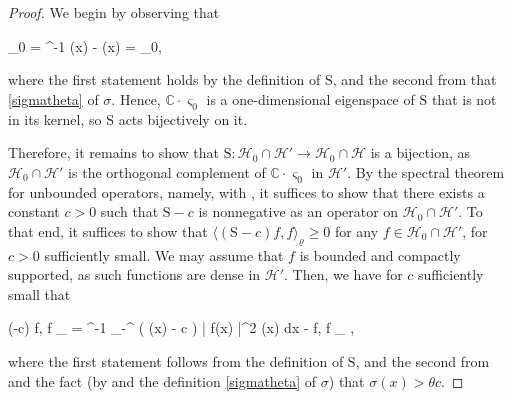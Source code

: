 \documentclass{amsart}
\numberwithin{equation}{section}
\theoremstyle{remark}
\theoremstyle{definition}
\begin{document}
	\begin{proof} 
		
		We begin by observing that
		\begin{flalign} 
			\label{salpha} 
			  \varsigma_0 = \theta^{-1} \cdot \sigma (x) -  \varrho (x)  = \alpha \cdot \varsigma_0,
		\end{flalign}
		
		\noindent where the first statement holds by the definition of $\bm{\mathrm{S}}$, and the second from that \eqref{sigmatheta} of $\sigma$. Hence, $\mathbb{C} \cdot \varsigma_0$ is a one-dimensional eigenspace of $\bm{\mathrm{S}}$ that is not in its kernel, so $\bm{\mathrm{S}}$ acts bijectively on it. 
		
		Therefore, it remains to show that $\bm{\mathrm{S}}: \mathcal{H}_0 \cap \mathcal{H}' \rightarrow \mathcal{H}_0 \cap \mathcal{H}$ is a bijection, as $\mathcal{H}_0 \cap \mathcal{H}'$ is the orthogonal complement of $\mathbb{C} \cdot \varsigma_0$ in $\mathcal{H}'$. By the spectral theorem for unbounded operators, namely, \cite[Proposition 5.13]{USOS} with \cite[Proposition 3.18]{USOS}, it suffices to show that there exists a constant $c>0$ such that $\bm{\mathrm{S}} - c$ is nonnegative as an operator on $\mathcal{H}_0 \cap \mathcal{H}'$. To that end, it suffices to show that $\langle (\bm{\mathrm{S}} - c) f, f \rangle_{\varrho} \ge 0$ for any $f \in \mathcal{H}_0 \cap \mathcal{H}'$, for $c>0$ sufficiently small. We may assume that $f$ is bounded and compactly supported, as such functions are dense in $\mathcal{H}'$. Then, we have for $c$ sufficiently small that
		\begin{flalign*}
			\langle (-c) f, f \rangle_{\varrho} = \theta^{-1} \displaystyle\int_{-\infty}^{\infty} ( \sigma(x) - c \theta) \cdot | f(x) |^2 \varrho (x) dx - \langle {} f, f \rangle_{\varrho} , 
		\end{flalign*} 
		
		\noindent where the first statement follows from the definition of $\bm{\mathrm{S}}$, and the second from  and the fact (by  and the definition \eqref{sigmatheta} of $\sigma$) that $\sigma(x) > \theta c$.
	\end{proof} 
	
\end{document}
